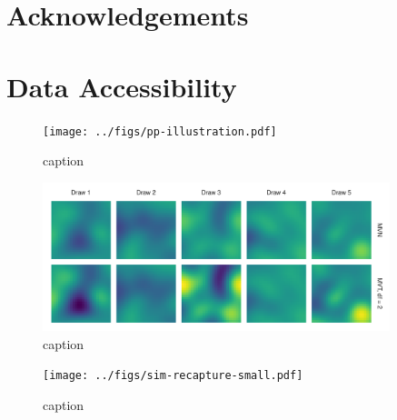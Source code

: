 \documentclass[12pt,english]{article}
\begin{document}
\begin{spacing}{1.25}
\section{Acknowledgements}

\section{Data Accessibility}


\begin{figure}[htb]
\begin{center}
  \texttt{[image: ../figs/pp-illustration.pdf]}
\caption{caption}
\label{fig:didactic}
\end{center}
\end{figure}

\begin{figure}[htb]
\begin{center}
  \includegraphics[width=0.9\textwidth]{../figs/nu-rf-illustration.pdf}
\caption{caption}
\label{fig:didactic}
\end{center}
\end{figure}

\begin{figure}[htb]
\begin{center}
  \texttt{[image: ../figs/sim-recapture-small.pdf]}
\caption{caption}
\label{fig:didactic}
\end{center}
\end{figure}


\end{spacing}
\end{document}
